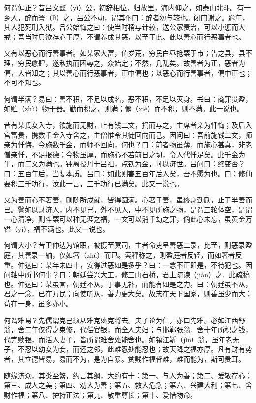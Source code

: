 \documentclass[12pt,UTF8]{ctexbook}
\begin{document}
何谓偏正？昔吕文懿（yì）公，初辞相位，归故里，海内仰之，如泰山北斗。有一乡人，醉而詈（lì）之，吕公不动，谓其仆曰：醉者勿与较也。闭门谢之。逾年，其人犯死刑入狱。吕公始悔之曰：使当时稍与计较，送公家责治，可以小惩而大戒；吾当时只欲存心于厚，不谓养成其恶，以至于此。此以善心而行恶事者也。

又有以恶心而行善事者。如某家大富，值岁荒，穷民白昼抢粟于市；告之县，县不理，穷民愈肆，遂私执而困辱之，众始定；不然，几乱矣。故善者为正，恶者为偏，人皆知之；其以善心而行恶事者，正中偏也；以恶心而行善事者，偏中正也；不可不知也。

何谓半满？易曰：善不积，不足以成名，恶不积，不足以灭身。书曰：商罪贯盈，如贮（zhù）物于器。勤而积之，则满；懈（xiè）而不积，则不满。此一说也。

昔有某氏女入寺，欲施而无财，止有钱二文，捐而与之，主席者亲为忏悔；及后入宫富贵，携数千金入寺舍之，主僧惟令其徒回向而己。因问曰：吾前施钱二文，师亲为忏悔，今施数千金，而师不回向，何也？曰：前者物虽薄，而施心甚真，非老僧亲忏，不足报德；今物虽厚，而施心不若前日之切，令人代忏足矣。此千金为半，而二文为满也。钟离授丹于吕祖，点铁为金，可以济世。吕问曰：终变否？曰：五百年后，当复本质。吕曰：如此则害五百年后人矣，吾不愿为也。曰：修仙要积三千功行，汝此一言，三千功行已满矣。此又一说也。

又为善而心不著善，则随所成就，皆得圆满。心著于善，虽终身勤励，止于半善而已。譬如以财济人，内不见己，外不见人，中不见所施之物，是谓三轮体空，是谓一心清净，则斗粟可以种无涯之福，一文可以消千劫之罪，倘此心未忘，虽黄金万镒（yì），福不满也。此又一说也。

何谓大小？昔卫仲达为馆职，被摄至冥司，主者命吏呈善恶二录，比至，则恶录盈庭，其善录一轴，仅如箸（zhù）而已。索秤称之，则盈庭者反轻，而如箸者反重。仲达曰：某年未四十，安得过恶如是多乎？曰：一念不正即是，不待犯也。因问轴中所书何事？曰：朝廷尝兴大工，修三山石桥，君上疏谏（jiàn）之，此疏稿也。仲达曰：某虽言，朝廷不从，于事无补，而能有如是之力。曰：朝廷虽不从，君之一念，已在万民；向使听从，善力更大矣。故志在天下国家，则善虽少而大；苟在一身，虽多亦小。

何谓难易？先儒谓克己须从难克处克将去。夫子论为仁，亦曰先难。必如江西舒翁，舍二年仅得之束修，代偿官银，而全人夫妇；与邯郸张翁，舍十年所积之钱，代完赎银，而活人妻子，皆所谓难舍处能舍也。如镇江靳（jìn）翁，虽年老无子，不忍以幼女为妾，而还之邻，此难忍处能忍也；故天降之福亦厚。凡有财有势者，其立德皆易，易而不为，是为自暴。贫贱作福皆难，难而能为，斯可贵耳。

随缘济众，其类至繁，约言其纲，大约有十：第一、与人为善；第二、爱敬存心；第三、成人之美；第四、劝人为善；第五、救人危急；第六、兴建大利；第七、舍财作福；第八、护持正法；第九、敬重尊长；第十、爱惜物命。
\end{document}
